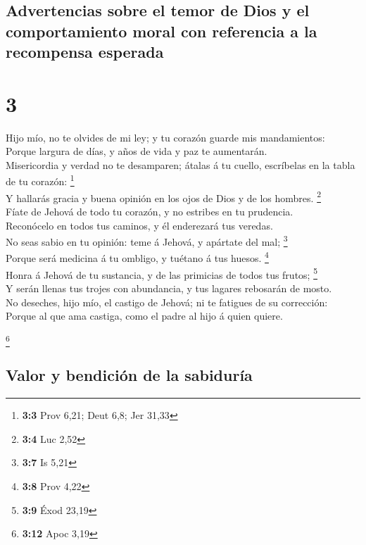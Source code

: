 \hypertarget{advertencias-sobre-el-temor-de-dios-y-el-comportamiento-moral-con-referencia-a-la-recompensa-esperada}{%
\subsection{Advertencias sobre el temor de Dios y el comportamiento
moral con referencia a la recompensa
esperada}\label{advertencias-sobre-el-temor-de-dios-y-el-comportamiento-moral-con-referencia-a-la-recompensa-esperada}}

\hypertarget{section-2}{%
\section{3}\label{section-2}}

 Hijo mío, no te olvides de mi ley; y tu corazón guarde mis
mandamientos:\\
 Porque largura de días, y años de vida y paz te
aumentarán.\\
 Misericordia y verdad no te desamparen; átalas á tu cuello,
escríbelas en la tabla de tu corazón: \footnote{\textbf{3:3} Prov 6,21;
  Deut 6,8; Jer 31,33}\\
 Y hallarás gracia y buena opinión en los ojos de Dios y de
los hombres. \footnote{\textbf{3:4} Luc 2,52}\\
 Fíate de Jehová de todo tu corazón, y no estribes en tu
prudencia.\\
 Reconócelo en todos tus caminos, y él enderezará tus
veredas.\\
 No seas sabio en tu opinión: teme á Jehová, y apártate del
mal; \footnote{\textbf{3:7} Is 5,21}\\
 Porque será medicina á tu ombligo, y tuétano á tus huesos.
\footnote{\textbf{3:8} Prov 4,22}\\
 Honra á Jehová de tu sustancia, y de las primicias de todos
tus frutos; \footnote{\textbf{3:9} Éxod 23,19}\\
 Y serán llenas tus trojes con abundancia, y tus lagares
rebosarán de mosto.\\
 No deseches, hijo mío, el castigo de Jehová; ni te
fatigues de su corrección:\\
 Porque al que ama castiga, como el padre al hijo á quien
quiere.

\footnote{\textbf{3:12} Apoc 3,19}

\hypertarget{valor-y-bendiciuxf3n-de-la-sabiduruxeda}{%
\subsection{Valor y bendición de la
sabiduría}\label{valor-y-bendiciuxf3n-de-la-sabiduruxeda}}

